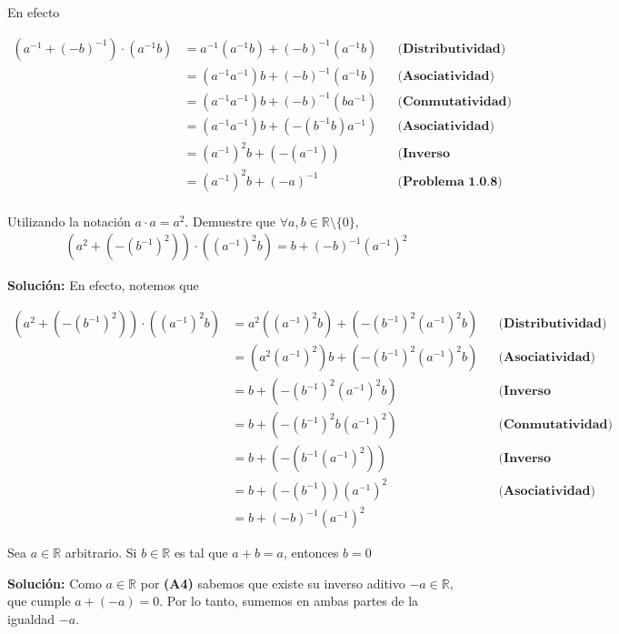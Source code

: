 \documentclass[12pt]{book}
\begin{document}
 En efecto

 \begin{align*}
      (a^{-1}+(-b)^{-1})\cdot (a^{-1}b)&= a^{-1}(a^{-1}b)+(-b)^{-1}(a^{-1}b) && \textbf{(Distributividad)} \\
      &= (a^{-1}a^{-1})b+(-b)^{-1}(a^{-1}b) && \textbf{(Asociatividad)} \\
      &=(a^{-1}a^{-1})b+(-b)^{-1}(ba^{-1}) && \textbf{(Conmutatividad)} \\
      &=(a^{-1}a^{-1})b+(-(b^{-1}b)a^{-1}) && \textbf{(Asociatividad)} \\
      &=(a^{-1})^2b+ (-(a^{-1})) && \textbf{(Inverso Multiplicativo)} \\
      &=(a^{-1})^2b+(-a)^{-1} && \textbf{(Problema 1.0.8)} \\
 \end{align*}
\begin{prob}
     \quad \quad
    Utilizando la notación $a \cdot a = a^2$. Demuestre que $\forall a,b \in \mathbb{R}\setminus \{0\}$, 
    \begin{align*}
        (a^2 + (-(b^{-1})^2))\cdot ((a^{-1})^2 b )= b + (-b)^{-1}(a^{-1})^2
    \end{align*}
\end{prob}
\textbf{Solución:}
En efecto, notemos que 

\begin{align*}
   (a^2 + (-(b^{-1})^2))\cdot ((a^{-1})^2 b )   &=a^2 ((a^{-1})^2 b ) + (-(b^{-1})^2 (a^{-1})^2 b ) && \textbf{(Distributividad)} \\
   &=(a^2 (a^{-1})^2)b  + (-(b^{-1})^2 (a^{-1})^2 b ) && \textbf{(Asociatividad)} \\
   &= b + (-(b^{-1})^2 (a^{-1})^2 b ) && \textbf{(Inverso Multiplicativo)} \\
   &= b + (-(b^{-1})^2  b (a^{-1})^2  ) && \textbf{(Conmutatividad)} \\
   &=b + (-(b^{-1}(a^{-1})^2  )) && \textbf{(Inverso Multiplicativo)} \\
   &=b + (-(b^{-1}))(a^{-1})^2 && \textbf{(Asociatividad)} \\
   &=b+ (-b)^{-1}(a^{-1})^2
\end{align*}
\begin{prob}
\quad \quad
    Sea $a \in \mathbb{R}$ arbitrario. Si $b \in \mathbb{R}$ es tal que $a+b=a$, entonces $b=0$
\end{prob}
\textbf{Solución:}
Como $a \in \mathbb{R}$ por \textbf{(A4)} sabemos que existe su inverso aditivo $-a \in \mathbb{R}$, que cumple $a + (-a)=0$. Por lo tanto, sumemos en ambas partes de la igualdad $-a$. 
\end{document}
